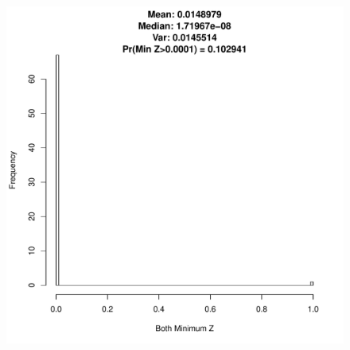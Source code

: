\documentclass{article}
\begin{document}
\begin{figure}[h!]
\begin{center}
\begin{minipage}[h!]{0.32\textwidth}
                \end{minipage}
		\begin{minipage}[h!]{0.32\textwidth}
                        \includegraphics[width=1.0\textwidth]{bothSimHistRast.pdf}
                \end{minipage}
		
        \end{center}
\end{figure}

%
%
%

%
\end{document}
